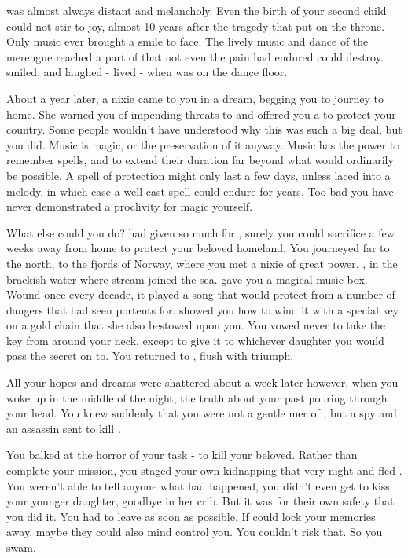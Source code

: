 \documentclass[char]{NeptuneBall}
\begin{document}
\cKing{\King} \cKing{} was almost always distant and melancholy. Even the birth of your second child could not stir \cKing{\them} to joy, almost 10 years after the tragedy that put \cKing{\them} on the throne. Only music ever brought a smile to \cKing{\their} face. The lively music and dance of the merengue reached a part of \cKing{\them} that not even the pain \cKing{\they} had endured could destroy. \cKing{\They} smiled, and laughed - \cKing{\They} lived - when \cKing{\they} was on the dance floor.

About a year later, a nixie came to you in a dream, begging you to journey to \cNixie{\them} home. She warned you of impending threats to \pAtlantis{} and offered you a \iMusicBox{\MYname} to protect your country. Some people wouldn't have understood why this was such a big deal, but you did. Music is magic, or the preservation of it anyway. Music has the power to remember spells, and to extend their duration far beyond what would ordinarily be possible. A spell of protection might only last a few days, unless laced into a melody, in which case a well cast spell could endure for years. Too bad you have never demonstrated a proclivity for magic yourself.

What else could you do? \cKing{} had given so much for \pAtlantis{}, surely you could sacrifice a few weeks away from home to protect your beloved homeland. You journeyed far to the north, to the fjords of Norway, where you met a nixie of great power, \cNixie{\MYname}, in the brackish water where \cNixie{\them} stream joined the sea. \cNixie{} gave you a magical music box. Wound once every decade, it played a song that would protect \pAtlantis{} from a number of dangers that \cNixie{} had seen portents for. \cNixie{\They} showed you how to wind it with a special key on a gold chain that she also bestowed upon you. You vowed never to take the key from around your neck, except to give it to whichever daughter you would pass the secret on to. You returned to \pAtlantis{}, flush with triumph.

All your hopes and dreams were shattered about a week later however, when you woke up in the middle of the night, the truth about your past pouring through your head. You knew suddenly that you were not a gentle mer\cQueen{\human} of \pAtlantis{}, but a spy and an assassin sent to kill \cKing{\King} \cKing{}.

You balked at the horror of your task - to kill your beloved. Rather than complete your mission, you staged your own kidnapping that very night and fled \pAtlantis{}. You weren't able to tell anyone what had happened, you didn't even get to kiss your younger daughter, \cPrincess{} goodbye in her crib. But it was for their own safety that you did it. You had to leave as soon as possible. If \pAssassin{} could lock your memories away, maybe they could also mind control you. You couldn't risk that. So you swam.
\end{document}
